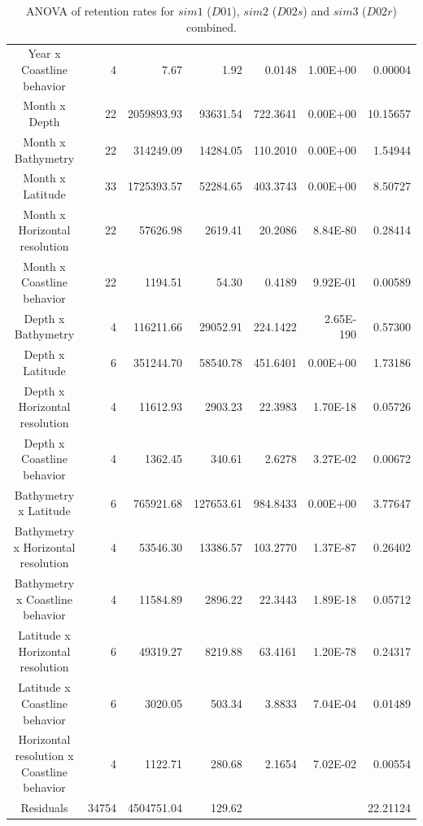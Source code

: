 \begin{table}[H]
\begin{adjustbox}{width=0.9\textwidth}
\begin{tabular}{c|r|r|r|r|r|r}
Year x Coastline behavior       & 4  & 7.67       & 1.92       & 0.0148     & 1.00E+00  & 0.00004  \\
Month x Depth                    & 22 & 2059893.93 & 93631.54   & 722.3641   & 0.00E+00  & 10.15657 \\
Month x Bathymetry               & 22 & 314249.09  & 14284.05   & 110.2010   & 0.00E+00  & 1.54944  \\
Month x Latitude                 & 33 & 1725393.57 & 52284.65   & 403.3743   & 0.00E+00  & 8.50727  \\
Month x Horizontal resolution    & 22 & 57626.98   & 2619.41    & 20.2086    & 8.84E-80  & 0.28414  \\
Month x Coastline behavior      & 22 & 1194.51    & 54.30      & 0.4189     & 9.92E-01  & 0.00589  \\
Depth x Bathymetry               & 4  & 116211.66  & 29052.91   & 224.1422   & 2.65E-190 & 0.57300  \\
Depth x Latitude                 & 6  & 351244.70  & 58540.78   & 451.6401   & 0.00E+00  & 1.73186  \\
Depth x Horizontal resolution    & 4  & 11612.93   & 2903.23    & 22.3983    & 1.70E-18  & 0.05726  \\
Depth x Coastline behavior      & 4  & 1362.45    & 340.61     & 2.6278     & 3.27E-02  & 0.00672  \\
Bathymetry x Latitude            & 6  & 765921.68  & 127653.61  & 984.8433   & 0.00E+00  & 3.77647  \\
Bathymetry x Horizontal resolution & 4 & 53546.30 & 13386.57 & 103.2770 & 1.37E-87 & 0.26402 \\
Bathymetry x Coastline behavior   & 4 & 11584.89   & 2896.22    & 22.3443    & 1.89E-18  & 0.05712  \\
Latitude x Horizontal resolution   & 6 & 49319.27   & 8219.88    & 63.4161    & 1.20E-78  & 0.24317  \\
Latitude x Coastline behavior     & 6 & 3020.05    & 503.34     & 3.8833     & 7.04E-04  & 0.01489  \\
Horizontal resolution x Coastline   behavior & 4 & 1122.71  & 280.68   & 2.1654   & 7.02E-02 & 0.00554 \\
Residuals                        & 34754 & 4504751.04 & 129.62     &        &           & 22.21124\\
\hline
\end{tabular}
\end{adjustbox}
\caption{ANOVA of retention rates for $sim 1$ ($D01$), $sim 2$ ($D02s$) and $sim 3$ ($D02r$) combined.}
\label{TabAnovaSimus}
\end{table}

